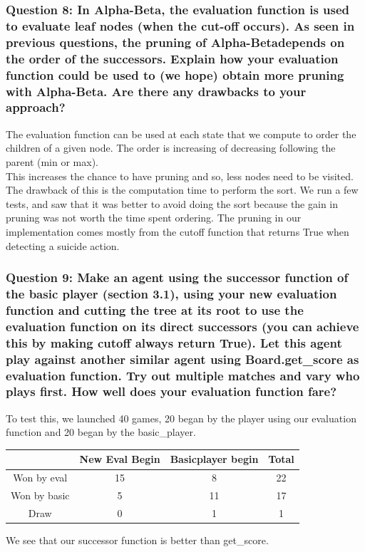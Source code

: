 \documentclass[a4paper,10pt]{article}
\begin{document}
				\subsubsection{Question 8: In Alpha-Beta, the evaluation function is used to evaluate leaf nodes (when the cut-off occurs). As seen in previous questions, the pruning of Alpha-Betadepends on the order of the successors. Explain how your evaluation function could be used to (we hope) obtain more pruning with Alpha-Beta. Are there any drawbacks to your approach?}
					The evaluation function can be used at each state that we compute to order the children of a given node. The order is increasing of decreasing following the parent (min or max).\\
					This increases the chance to have pruning and so, less nodes need to be visited.\\
					The drawback of this is the computation time to perform the sort. We run a few tests, and saw that it was better to avoid doing the sort because the gain in pruning was not worth the time spent ordering.
					The pruning in our implementation comes mostly from the cutoff function that returns True when detecting a suicide action.
				\subsubsection{Question 9: Make an agent using the successor function of the basic player (section 3.1), using your new evaluation function and cutting the tree at its root to use the evaluation function on its direct successors (you can achieve this by making cutoff always return True). Let this agent play against another similar agent using Board.get\_score as evaluation function. Try out multiple matches and vary who plays first. How well does your evaluation function fare?}
					To test this, we launched 40 games, 20 began by the player using our evaluation function and 20 began by the basic\_player.
					\begin{center}
					\begin{tabular}{|c|c|c|c|}
						\hline 
						 & New Eval Begin & Basicplayer begin & Total \\ 
						\hline 
						Won by eval & 15 & 8 & 22 \\ 
						\hline 
						Won by basic & 5 & 11 & 17 \\ 
						\hline 
						Draw & 0 & 1 & 1 \\ 
						\hline 
						\end{tabular} 
					\end{center}
					We see that our successor function is better than get\_score.
\end{document}
